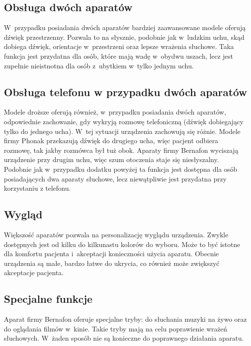\documentclass[journal]{IEEEtran}
\begin{document}
\subsection{Obsługa dwóch aparatów}

W~przypadku posiadania dwóch aparatów bardziej zaawansowane modele oferują dźwięk przestrzenny. Pozwala to na słysznie, podobnie jak w~ludzkim uchu, skąd dobiega dźwięk, orientacje w~przestrzeni oraz lepsze wrażenia słuchowe. Taka funkcja jest przydatna dla osób, które mają wadę w~obydwu uszach, lecz jest zupełnie nieistnotna dla osób z~ubytkiem w~tylko jednym uchu.

\subsection{Obsługa telefonu w przypadku dwóch aparatów}

Modele droższe oferują również, w~przypadku posiadania dwóch aparatów, odpowiednie zachowanie, gdy wykryją rozmowę telefoniczną (dźwięk dobiegający tylko do jednego ucha). W~tej sytuacji urządzenia zachowują się różnie. Modele firmy Phonak przekazują dźwięk do drugiego ucha, więc pacjent odbiera rozmowę, tak jakby rozmówca był tuż obok. Aparaty firmy Bernafon wyciszają urządzenie przy drugim uchu, więc szum otoczenia staje się niesłyszalny. Podobnie jak w~przypadku dodatku powyżej ta funkcja jest dostępna dla osób posiadających dwa aparaty słuchowe, lecz niewątpliwie jest przydatna przy korzystaniu z telefonu.

\subsection{Wygląd}

Większość aparatów pozwala na personalizację wyglądu urządzenia. Zwykle dostępnych jest od kilku do kilkunastu kolorów do wyboru. Może to być istotne dla komfortu pacjenta i~akceptacji konieczności użycia aparatu. Obecnie urządzenia są małe, bardzo łatwe do ukrycia, co również może zwiększyć akceptacje pacjenta.

\subsection{Specjalne funkcje}

Aparat firmy Bernafon oferuje specjalne tryby: do słuchania muzyki na żywo oraz do oglądania filmów w~kinie. Takie tryby mają na celu poprawienie wrażeń słuchowych. W~żaden sposób nie są konieczne do poprawnego działania aparatu. 
\end{document}

